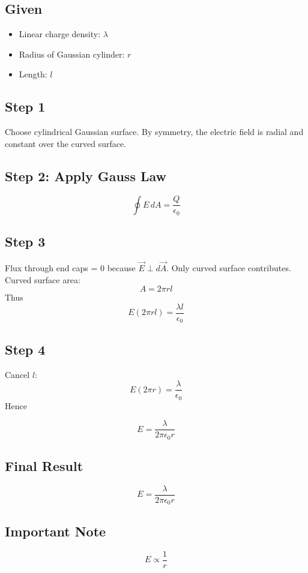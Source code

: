 \documentclass[11pt,a4paper]{article}
\begin{document}
\subsection*{Given}
\begin{itemize}
    \item Linear charge density: \( \lambda \)
    \item Radius of Gaussian cylinder: \( r \)
    \item Length: \( l \)
\end{itemize}

\subsection*{Step 1}
Choose cylindrical Gaussian surface. By symmetry, the electric field is radial and constant over the curved surface.

\subsection*{Step 2: Apply Gauss Law}
\[ \oint E \, dA = \frac{Q}{\epsilon_0} \]

\subsection*{Step 3}
Flux through end caps = 0 because \( \vec{E} \perp d\vec{A} \).
Only curved surface contributes.
Curved surface area:
\[ A = 2\pi rl \]
Thus
\[ E(2\pi rl) = \frac{\lambda l}{\epsilon_0} \]

\subsection*{Step 4}
Cancel \( l \):
\[ E(2\pi r) = \frac{\lambda}{\epsilon_0} \]
Hence
\begin{tcolorbox}[colback=RoyalBlue!5!white, colframe=RoyalBlue]
    \[ E = \frac{\lambda}{2\pi\epsilon_0 r} \]
\end{tcolorbox}

\subsection*{Final Result}
\begin{tcolorbox}[colback=RoyalBlue!5!white, colframe=RoyalBlue]
    \[ E = \frac{\lambda}{2\pi\epsilon_0 r} \]
\end{tcolorbox}

\subsection*{Important Note}
\[ E \propto \frac{1}{r} \]
\end{document}
